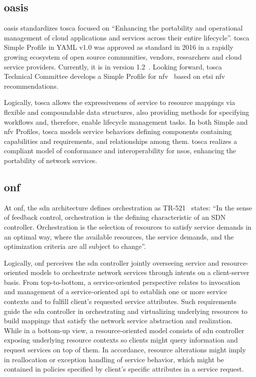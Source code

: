 \subsection{\acrfull{oasis}}
\gls{oasis} standardizes \gls{tosca} focused on ``Enhancing the portability and operational management of cloud applications and services across their entire lifecycle''. \gls{tosca} Simple Profile in YAML v1.0 was approved as standard in 2016 in a rapidly growing ecosystem of open source communities, vendors, researchers and cloud service providers. Currently, it is in version 1.2~\cite{OASIS2017TOSCA1.2}. Looking forward, \gls{tosca} Technical Committee develops a Simple Profile for \gls{nfv}~\cite{OASIS2017TOSCA1.0} based on \gls{etsi} \gls{nfv} recommendations. 

Logically, \gls{tosca} allows the expressiveness of service to resource mappings via flexible and compoundable data structures, also providing methods for specifying workflows and, therefore, enable lifecycle management tasks. In both Simple and \gls{nfv} Profiles, \gls{tosca} models service behaviors defining components containing capabilities and requirements, and relationships among them. \gls{tosca} realizes a compliant model of conformance and interoperability for \glspl{nso}, enhancing the portability of network services. 

\subsection{\acrfull{onf}}
At \gls{onf}, the \gls{sdn} architecture defines orchestration as TR-521~\cite{ONF:Orch:2017} states: ``In the sense of feedback control, orchestration is the defining characteristic of an SDN controller. Orchestration is the selection of resources to satisfy service demands in an optimal way, where the available resources, the service demands, and the optimization criteria are all subject to change''.  

Logically, \gls{onf} perceives the \gls{sdn} controller jointly overseeing service and resource-oriented models to orchestrate network services through intents on a client-server basis. From top-to-bottom, a service-oriented perspective relates to invocation and management of a service-oriented \gls{api} to establish one or more service contexts and to fulfill client's requested service attributes. 
Such requirements guide the \gls{sdn} controller in orchestrating and virtualizing underlying resources to build mappings that satisfy the network service abstraction and realization. While in a bottom-up view, a resource-oriented model consists of \gls{sdn} controller exposing underlying resource contexts so clients might query information and request services on top of them. In accordance, resource alterations might imply in reallocation or exception handling of service behavior, which might be contained in policies specified by client's specific attributes in a service request.

